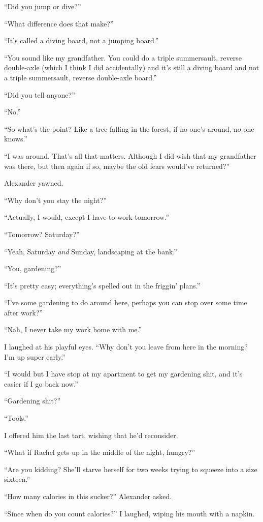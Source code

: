 ``Did you jump or dive?''

``What difference does that make?''

``It's called a diving board, not a jumping board.''

``You sound like my grandfather. You could do a triple summersault,
reverse double-axle (which I think I did accidentally) and it's still a
diving board and not a triple summersault, reverse double-axle board.''

``Did you tell anyone?''

``No.''

``So what's the point? Like a tree falling in the forest, if no one's
around, no one knows.''

``I was around. That's all that matters. Although I did wish that my
grandfather was there, but then again if so, maybe the old fears
would've returned?''

Alexander yawned.

``Why don't you stay the night?''

``Actually, I would, except I have to work tomorrow.''

``Tomorrow? Saturday?''

``Yeah, Saturday \emph{and} Sunday, landscaping at the bank.''

``You, gardening?''

``It's pretty easy; everything's spelled out in the friggin' plans.''

``I've some gardening to do around here, perhaps you can stop over some
time after work?''

``Nah, I never take my work home with me.''

I laughed at his playful eyes. ``Why don't you leave from here in the
morning? I'm up super early.''

``I would but I have stop at my apartment to get my gardening shit, and
it's easier if I go back now.''

``Gardening shit?''

``Tools.''

I offered him the last tart, wishing that he'd reconsider.

``What if Rachel gets up in the middle of the night, hungry?''

``Are you kidding? She'll starve herself for two weeks trying to squeeze
into a size sixteen.''

``How many calories in this sucker?'' Alexander asked.

``Since when do you count calories?'' I laughed, wiping his mouth with a
napkin.

